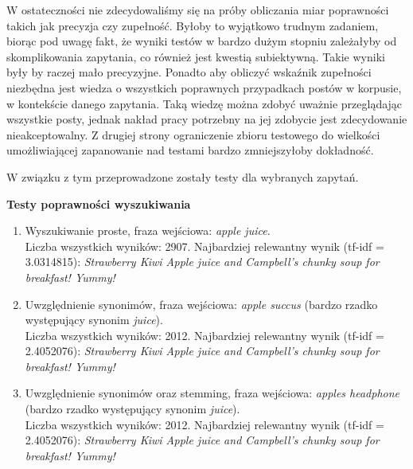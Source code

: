 \documentclass[runningheads]{llncs}
\begin{document}
	
	
	
	

W ostateczności nie zdecydowaliśmy się na próby  obliczania miar poprawności
takich jak precyzja czy zupełność. Byłoby to  wyjątkowo trudnym zadaniem, biorąc
pod uwagę fakt, że wyniki testów w bardzo dużym  stopniu zależałyby od
skomplikowania zapytania, co również jest kwestią  subiektywną. Takie wyniki
były by raczej mało precyzyjne. Ponadto aby obliczyć  wskaźnik zupełności
niezbędna jest wiedza o wszystkich poprawnych przypadkach  postów w korpusie, w
kontekście danego zapytania. Taką wiedzę można zdobyć  uważnie przeglądając
wszystkie posty, jednak nakład pracy potrzebny na jej  zdobycie jest
zdecydowanie nieakceptowalny. Z drugiej strony  ograniczenie zbioru testowego do
wielkości umożliwiającej zapanowanie nad testami bardzo zmniejszyłoby
dokładność.

W związku z tym przeprowadzone zostały testy dla wybranych zapytań.

\newpage
\textbf{Testy poprawności wyszukiwania}\\

\begin{enumerate}
\item Wyszukiwanie proste, fraza wejściowa: \emph{apple juice}.\\
   Liczba wszystkich wyników: 2907. 
   Najbardziej relewantny wynik (tf-idf =  3.0314815):  
   \emph{Strawberry Kiwi Apple juice and Campbell's chunky soup for breakfast!  Yummy!}

\item Uwzględnienie synonimów, fraza wejściowa: \emph{apple succus} (bardzo rzadko występujący synonim \emph{juice}).\\
  Liczba wszystkich wyników: 2012.
  Najbardziej relewantny wynik (tf-idf = 2.4052076):
  \emph{Strawberry Kiwi Apple juice and Campbell's chunky soup for breakfast!  Yummy!}

\item Uwzględnienie synonimów oraz stemming, fraza wejściowa: \emph{apples headphone} (bardzo rzadko występujący synonim \emph{juice}).\\
  Liczba wszystkich wyników: 2012.
  Najbardziej relewantny wynik (tf-idf = 2.4052076):
  \emph{Strawberry Kiwi Apple juice and Campbell's chunky soup for breakfast!  Yummy!}

\end{enumerate}
   
\end{document}
